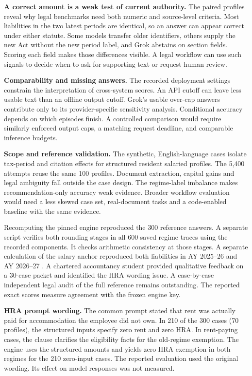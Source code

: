 \documentclass[10pt,letterpaper,twocolumn]{article}
\begin{document}
\textbf{A correct amount is a weak test of current authority.} The paired profiles reveal why legal benchmarks need both numeric and source-level criteria. Most liabilities in the two latest periods are identical, so an answer can appear correct under either statute. Some models transfer older identifiers, others supply the new Act without the new period label, and Grok abstains on section fields. Scoring each field makes those differences visible. A legal workflow can use such signals to decide when to ask for supporting text or request human review.

\textbf{Comparability and missing answers.} The recorded deployment settings constrain the interpretation of cross-system scores. An API cutoff can leave less usable text than an offline output cutoff. Grok's usable over-cap answers contribute only to its provider-specific sensitivity analysis. Conditional accuracy depends on which episodes finish. A controlled comparison would require similarly enforced output caps, a matching request deadline, and comparable inference budgets.

\textbf{Scope and reference validation.}
The synthetic, English-language cases isolate tax-period and citation effects for structured resident salaried profiles. The 5,400 attempts reuse the same 100 profiles. Document extraction, capital gains and legal ambiguity fall outside the case design. The regime-label imbalance makes recommendation-only accuracy weak evidence. Broader workflow evaluation would need a less skewed case set, real-document tasks and a code-enabled baseline with the same evidence.

Recomputing the pinned engine reproduced the 300 reference answers. A separate script verifies both rounding stages in all 600 saved regime traces using the recorded components. It checks arithmetic consistency at those stages. A separate calculation of the salary anchor reproduced both liabilities in AY 2025--26 and AY 2026--27 \cite{salaried25,salaried26}. A chartered accountancy student provided qualitative feedback on a 30-case packet and identified the HRA wording issue. A case-by-case independent legal audit of the full reference remains outstanding. The reported exact scores measure agreement with the frozen engine key.

\textbf{HRA prompt wording.} The common prompt stated that rent was actually paid for accommodation the employee did not own. In 210 of the 300 cases (70 profiles), the structured inputs specify zero rent and zero HRA. In rent-paying cases, the clause clarifies the eligibility facts for the old-regime exemption. The engine uses the structured amounts and yields zero HRA exemption in both regimes for the 210 zero-input cases. The reported evaluation used the original wording. Its effect on model responses was not measured.
\end{document}
